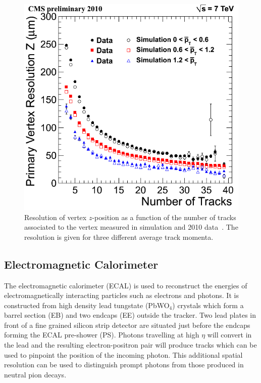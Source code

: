\begin{figure}
\begin{center}
	\includegraphics[width=.6\textwidth]{detector/trcker/zresotrcker.png}
	\caption{Resolution of vertex $z$-position as a function of the number 
	of tracks associated to the vertex measured in simulation and 
	2010 data~\citep{TRK-10-005}.
 	The resolution is given for three different average track momenta.}
	\label{fig:vtxreso}
\end{center}
\end{figure}

\subsection{Electromagnetic Calorimeter}
The electromagnetic calorimeter (ECAL) is used to reconstruct the energies of electromagnetically 
interacting particles such as electrons and photons. 
It is constructed from high density lead tungstate (PbWO$_{4}$) crystals which
form a barrel section (EB) and two endcaps (EE) outside the tracker. 
Two lead plates in front of a fine grained silicon strip detector are situated just before the 
endcaps forming the ECAL pre-shower (PS). 
Photons travelling at high $\eta$ will convert in the lead and the resulting electron-positron pair
will produce tracks which can be used to pinpoint the position of the incoming photon. This additional
spatial resolution can be used to distinguish prompt photons from those produced
in neutral pion decays.

